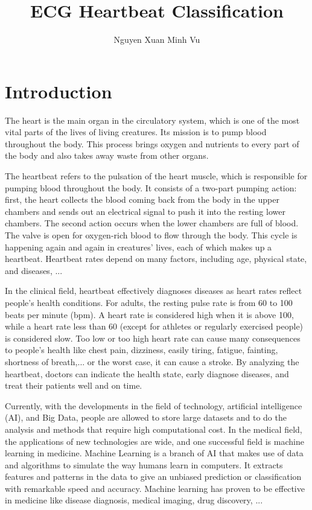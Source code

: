 \documentclass[conference]{IEEEtran}
\title{ECG Heartbeat Classification}
\author{Nguyen Xuan Minh Vu}
\begin{document}
\maketitle

\section{Introduction}

The heart is the main organ in the circulatory system, which is one of the most vital parts of the lives of living creatures. Its mission is to pump blood throughout the body. This process brings oxygen and nutrients to every part of the body and also takes away waste from other organs. 

The heartbeat refers to the pulsation of the heart muscle, which is responsible for pumping blood throughout the body. It consists of a two-part pumping action: first, the heart collects the blood coming back from the body in the upper chambers and sends out an electrical signal to push it into the resting lower chambers. The second action occurs when the lower chambers are full of blood. The valve is open for oxygen-rich blood to flow through the body. This cycle is happening again and again in creatures' lives, each of which makes up a heartbeat. Heartbeat rates depend on many factors, including age, physical state, and diseases, ...

In the clinical field, heartbeat effectively diagnoses diseases as heart rates reflect people's health conditions. For adults, the resting pulse rate is from 60 to 100 beats per minute (bpm). A heart rate is considered high when it is above 100, while a heart rate less than 60 (except for athletes or regularly exercised people) is considered slow. Too low or too high heart rate can cause many consequences to people's health like chest pain, dizziness, easily tiring, fatigue, fainting, shortness of breath,... or the worst case, it can cause a stroke. By analyzing the heartbeat, doctors can indicate the health state, early diagnose diseases, and treat their patients well and on time.

Currently, with the developments in the field of technology, artificial intelligence (AI), and Big Data, people are allowed to store large datasets and to do the analysis and methods that require high computational cost. In the medical field, the applications of new technologies are wide, and one successful field is machine learning in medicine. Machine Learning is a branch of AI that makes use of data and algorithms to simulate the way humans learn in computers. It extracts features and patterns in the data to give an unbiased prediction or classification with remarkable speed and accuracy. Machine learning has proven to be effective in medicine like disease diagnosis, medical imaging, drug discovery, ...
\end{document}
